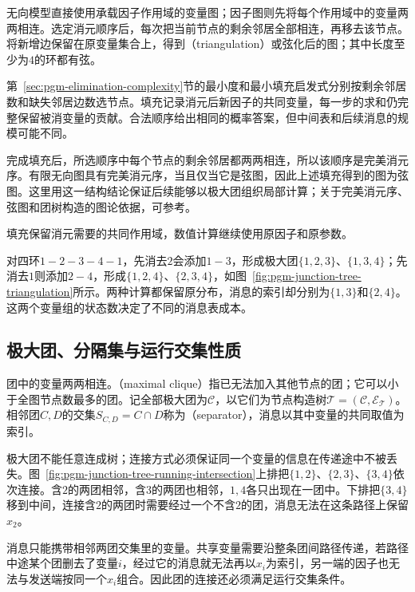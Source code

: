 无向模型直接使用承载因子作用域的变量图；因子图则先将每个作用域中的变量两两相连。选定消元顺序后，每次把当前节点的剩余邻居全部相连，再移去该节点。将新增边保留在原变量集合上，得到（triangulation）或弦化后的图；其中长度至少为$4$的环都有弦。

第~\ref{sec:pgm-elimination-complexity}节的最小度和最小填充启发式分别按剩余邻居数和缺失邻居边数选节点。填充记录消元后新因子的共同变量，每一步的求和仍完整保留被消变量的贡献。合法顺序给出相同的概率答案，但中间表和后续消息的规模可能不同。

完成填充后，所选顺序中每个节点的剩余邻居都两两相连，所以该顺序是完美消元序。有限无向图具有完美消元序，当且仅当它是弦图，因此上述填充得到的图为弦图。这里用这一结构结论保证后续能够以极大团组织局部计算；关于完美消元序、弦图和团树构造的图论依据，可参考。

填充保留消元需要的共同作用域，数值计算继续使用原因子和原参数。

对四环$1-2-3-4-1$，先消去$2$会添加$1-3$，形成极大团$\{1,2,3\}$、$\{1,3,4\}$；先消去$1$则添加$2-4$，形成$\{1,2,4\}$、$\{2,3,4\}$，如图~\ref{fig:pgm-junction-tree-triangulation}所示。两种计算都保留原分布，消息的索引却分别为$\{1,3\}$和$\{2,4\}$。这两个变量组的状态数决定了不同的消息表成本。

\subsection{极大团、分隔集与运行交集性质}
\label{sec:pgm-junction-tree-running-intersection}

团中的变量两两相连。（maximal clique）指已无法加入其他节点的团；它可以小于全图节点数最多的团。记全部极大团为$\mathcal C$，以它们为节点构造树$\mathcal T=(\mathcal C,\mathcal E_{\mathcal T})$。相邻团$C,D$的交集$S_{C,D}=C\cap D$称为（separator），消息以其中变量的共同取值为索引。

极大团不能任意连成树；连接方式必须保证同一个变量的信息在传递途中不被丢失。图~\ref{fig:pgm-junction-tree-running-intersection}上排把$\{1,2\}$、$\{2,3\}$、$\{3,4\}$依次连接。含$2$的两团相邻，含$3$的两团也相邻，$1,4$各只出现在一团中。下排把$\{3,4\}$移到中间，连接含$2$的两团时需要经过一个不含$2$的团，消息无法在这条路径上保留$x_2$。

消息只能携带相邻两团交集里的变量。共享变量需要沿整条团间路径传递，若路径中途某个团删去了变量$i$，经过它的消息就无法再以$x_i$为索引，另一端的因子也无法与发送端按同一个$x_i$组合。因此团的连接还必须满足运行交集条件。

